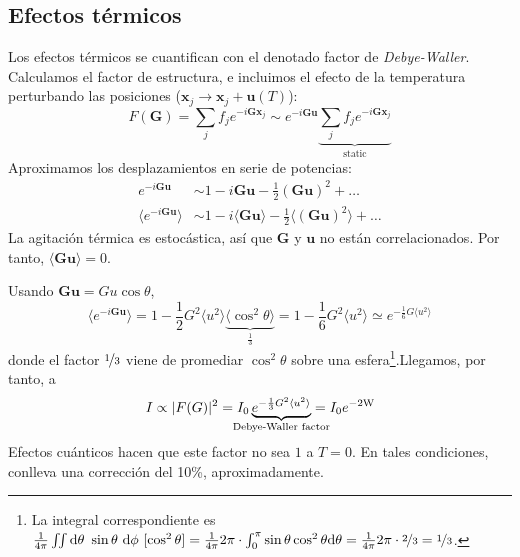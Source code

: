 \subsection{Efectos térmicos}
Los efectos térmicos se cuantifican con el denotado factor de
\emph{Debye-Waller}. Calculamos el factor de estructura, e incluimos el efecto
de la temperatura perturbando las posiciones ($\mathbf{x}_j \rightarrow
\mathbf{x}_j + \mathbf{u}(T) $):
\begin{equation}
  F(\mathbf{G}) = \sum_j f_j e ^{-i\mathbf{G}\mathbf{x}_j} \sim e ^{-i\mathbf{G}\mathbf{u}} \underbrace{\sum_j f_j e ^{-i\mathbf{G}\mathbf{x}_j}}_{\text{static}}
\end{equation}
Aproximamos los desplazamientos en serie de potencias:
\begin{equation}
\begin{split}
  e ^{-i\mathbf{G}\mathbf{u}} &\sim 1 - i \mathbf{G} \mathbf{u} - \frac{1}{2} (\mathbf{G}\mathbf{u})^2 + \dots \\ 
   \langle e ^{-i\mathbf{G}\mathbf{u}} \rangle &\sim 1 - i \langle \mathbf{G} \mathbf{u} \rangle - \frac{1}{2} \langle (\mathbf{G}\mathbf{u})^2  \rangle+ \dots
\end{split}
\end{equation}
La agitación térmica es estocástica, así que $\mathbf{G}$ y
$\mathbf{u}$ no están correlacionados. Por tanto,
$\langle \mathbf{G}\mathbf{u} \rangle = 0$.

Usando $\mathbf{G}\mathbf{u} = Gu\cos \theta$,
\begin{equation}
  \langle e ^{-i\mathbf{G}\mathbf{u}} \rangle = 1 - \frac{1}{2} G^2
  \langle u^2 \rangle \underbrace{ \langle 
    \cos^2 \theta \rangle}_{\frac{1}{3}} = 
  1 - \frac{1}{6}G^2 \langle u^2 \rangle \simeq e ^{-\frac{1}{6}G\langle u^2 \rangle }
\end{equation}
donde el factor $\nicefrac{1}{3}$ viene de promediar $\cos^2 \theta$
sobre una esfera\footnote{La integral correspondiente es
  $\frac{1}{4\pi} \iint \text{d}\theta\ \sin \theta \ \text{d}\phi\
  [\cos ^2\theta] = \frac{1}{4\pi} 2\pi \cdot \int_0^{\pi} \sin \theta
  \cos ^2\theta \text{d}\theta = \frac{1}{4\pi} 2\pi \cdot
  \nicefrac{2}{3} = \nicefrac{1}{3}$.}.Llegamos, por tanto, a 
\begin{equation}
  I \propto \vert F(G) \vert^2 = I_0 \underbrace{e^{-\frac{1}{3}G^2 \langle u^2 \rangle }
  }_{\mathclap{\text{Debye-Waller factor}}} = I_0 e^{-2 \text{W}}
\end{equation}
Efectos cuánticos hacen que este factor no sea $1$ a $T=0$. En tales
condiciones, conlleva una corrección del 10\%, aproximadamente.

